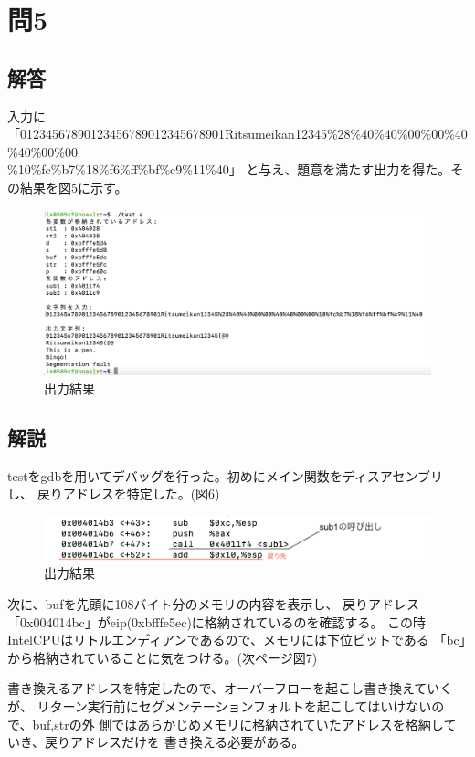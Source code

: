 \documentclass[dvipdfmx,autodetect-engine,titlepage]{jsarticle}
\begin{document}
\section{問5}

\subsection{解答}

入力に「01234567890123456789012345678901Ritsumeikan12345\%28\%40\%40\%00\%00\%40\%40\%00\%00\\\%10\%fc\%b7\%18\%f6\%ff\%bf\%c9\%11\%40」
と与え、題意を満たす出力を得た。その結果を図5に示す。

\begin{figure}[h]
  \centering
  \includegraphics[scale=0.45]{pic5.png}
  \caption{出力結果}
\end{figure}

\subsection{解説}
testをgdbを用いてデバッグを行った。初めにメイン関数をディスアセンブリし、
戻りアドレスを特定した。(図6)

\begin{figure}[h]
  \centering
  \includegraphics[scale=1]{pic6.png}
  \caption{出力結果}
\end{figure}

次に、bufを先頭に108バイト分のメモリの内容を表示し、
戻りアドレス「0x004014bc」がeip(0xbfffe5ec)に格納されているのを確認する。
この時IntelCPUはリトルエンディアンであるので、メモリには下位ビットである
「bc」から格納されていることに気をつける。(次ページ図7)

書き換えるアドレスを特定したので、オーバーフローを起こし書き換えていくが、
リターン実行前にセグメンテーションフォルトを起こしてはいけないので、buf,strの外
側ではあらかじめメモリに格納されていたアドレスを格納していき、戻りアドレスだけを
書き換える必要がある。
\end{document}
